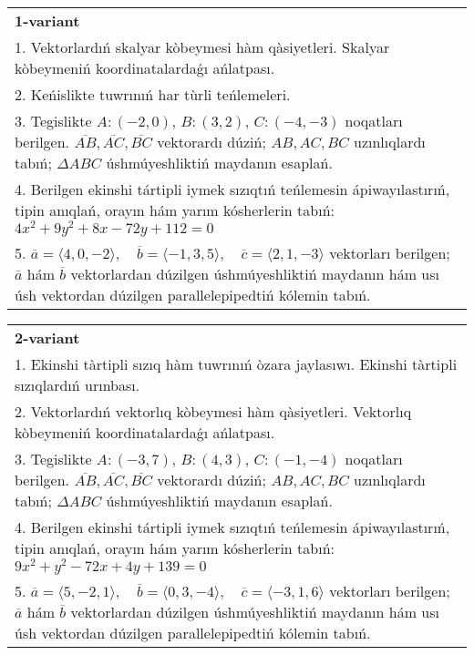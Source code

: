 \documentclass{article}
\begin{document}
\large
{}


\begin{tabular}{m{17cm}}
\textbf{1-variant}\\
1. Vektorlardıń skalyar kòbeymesi hàm qàsiyetleri. Skalyar kòbeymeniń koordinatalardaǵı ańlatpası.\\

2. Keńislikte tuwrınıń har tùrli teńlemeleri. \\

3. Tegislikte $A: (-2, 0)$, $B: (3, 2)$, $C: (-4, -3)$ noqatları berilgen. $\overline{AB}, \overline{AC}, \overline{BC}$ vektorardı dúziń; $AB, AC, BC$ uzınlıqlardı tabıń; $\Delta ABC$ úshmúyeshliktiń maydanın esaplań. \\

4. Berilgen ekinshi tártipli iymek sızıqtıń teńlemesin ápiwayılastırıń, tipin anıqlań, orayın hám yarım kósherlerin tabıń: $4x^2+9y^2+8x-72y+112=0$\\

5. \(\overline{a} = \langle 4, 0, -2 \rangle, \quad \overline{b} = \langle -1, 3, 5 \rangle, \quad \overline{c} = \langle 2, 1, -3 \rangle\) vektorları berilgen; \(\overline{a}\) hám \(\overline{b}\) vektorlardan dúzilgen úshmúyeshliktiń maydanın hám usı úsh vektordan dúzilgen parallelepipedtiń kólemin tabıń.
\end{tabular}
\vspace{1cm}


\begin{tabular}{m{17cm}}
\textbf{2-variant}\\
1. Ekinshi tàrtipli sızıq hàm tuwrınıń òzara jaylasıwı. Ekinshi tàrtipli sızıqlardıń urınbası.\\

2. Vektorlardıń vektorlıq kòbeymesi hàm qàsiyetleri. Vektorlıq kòbeymeniń koordinatalardaǵı ańlatpası. \\

3. Tegislikte $A: (-3, 7)$, $B: (4, 3)$, $C: (-1, -4)$ noqatları berilgen. $\overline{AB}, \overline{AC}, \overline{BC}$ vektorardı dúziń; $AB, AC, BC$ uzınlıqlardı tabıń; $\Delta ABC$ úshmúyeshliktiń maydanın esaplań. \\

4. Berilgen ekinshi tártipli iymek sızıqtıń teńlemesin ápiwayılastırıń, tipin anıqlań, orayın hám yarım kósherlerin tabıń: $9x^2+y^2-72x+4y+139=0$\\

5. \(\overline{a} = \langle 5, -2, 1 \rangle, \quad \overline{b} = \langle 0, 3, -4 \rangle, \quad \overline{c} = \langle -3, 1, 6 \rangle\) vektorları berilgen; \(\overline{a}\) hám \(\overline{b}\) vektorlardan dúzilgen úshmúyeshliktiń maydanın hám usı úsh vektordan dúzilgen parallelepipedtiń kólemin tabıń.
\end{tabular}
\vspace{1cm}
\end{document}
